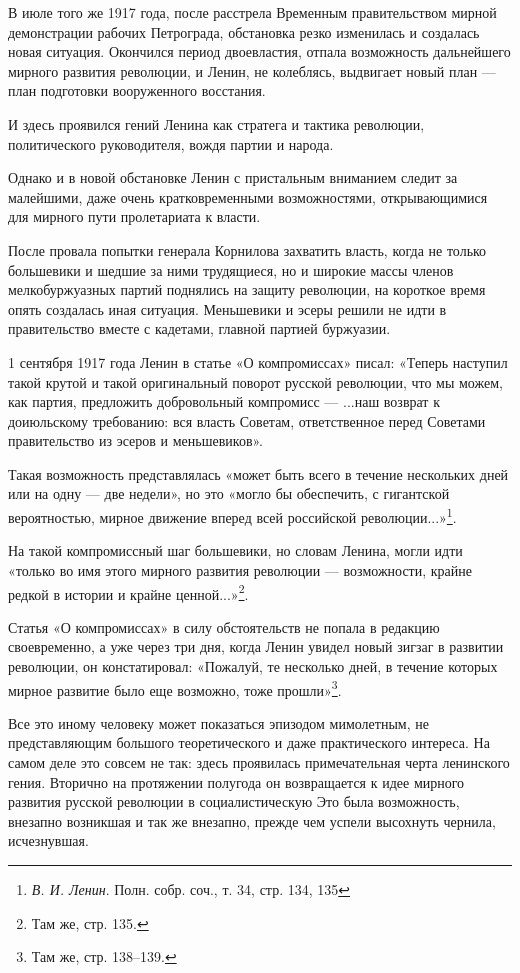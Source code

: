 \documentclass[12pt, a4paper, openany]{book}
\begin{document}
В июле того же 1917 года, после расстрела Временным правительством мирной демонстрации рабочих Петрограда, обстановка резко изменилась и создалась новая ситуация. Окончился период двоевластия, отпала возможность дальнейшего мирного развития революции, и Ленин, не колеблясь, выдвигает новый план — план подготовки вооруженного восстания.

И здесь проявился гений Ленина как стратега и тактика революции, политического руководителя, вождя партии и народа.

Однако и в новой обстановке Ленин с пристальным вниманием следит за малейшими, даже очень кратковременными возможностями, открывающимися для мирного пути пролетариата к власти.

После провала попытки генерала Корнилова захватить власть, когда не только большевики и шедшие за ними трудящиеся, но и широкие массы членов мелкобуржуазных партий поднялись на защиту революции, на короткое время опять создалась иная ситуация. Меньшевики и эсеры решили не идти в правительство вместе с кадетами, главной партией буржуазии.

1 сентября 1917 года Ленин в статье «О компромиссах» писал: «Теперь наступил такой крутой и такой оригинальный поворот русской революции, что мы можем, как партия, предложить добровольный компромисс — ...наш возврат к доиюльскому требованию: вся власть Советам, ответственное перед Советами правительство из эсеров и меньшевиков».

Такая возможность представлялась «может быть всего в течение нескольких дней или на одну — две недели», но это «могло бы обеспечить, с гигантской вероятностью, мирное движение вперед всей российской революции...»\footnote{\textit{В. И. Ленин}. Полн. собр. соч., т. 34, стр. 134, 135}.

На такой компромиссный шаг большевики, но словам Ленина, могли идти «только во имя этого мирного развития революции — возможности, крайне редкой в истории и крайне ценной...»\footnote{Там же, стр. 135.}.

Статья «О компромиссах» в силу обстоятельств не попала в редакцию своевременно, а уже через три дня, когда Ленин увидел новый зигзаг в развитии революции, он констатировал: «Пожалуй, те несколько дней, в течение которых мирное развитие было еще возможно, тоже прошли»\footnote{Там же, стр. 138–139.}.

Все это иному человеку может показаться эпизодом мимолетным, не представляющим большого теоретического и даже практического интереса. На самом деле это совсем не так: здесь проявилась примечательная черта ленинского гения. Вторично на протяжении полугода он возвращается к идее мирного развития русской революции в социалистическую Это была возможность, внезапно возникшая и так же внезапно, прежде чем успели высохнуть чернила, исчезнувшая.
\end{document}
